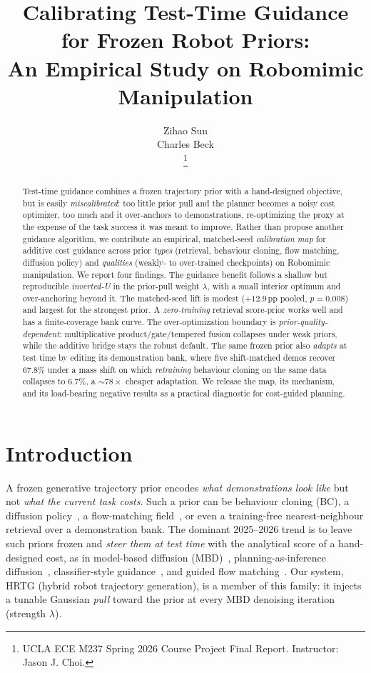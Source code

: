 \documentclass[letterpaper, 10 pt, conference]{ieeeconf}
\title{\LARGE \bf
Calibrating Test-Time Guidance for Frozen Robot Priors:\\
An Empirical Study on Robomimic Manipulation}
\author{ \parbox{3 in}{\centering Zihao Sun}
        \hspace*{ 0.1 in}
        \parbox{2.5 in}{ \centering Charles Beck}
\thanks{UCLA ECE M237 Spring 2026 Course Project Final Report.
Instructor: Jason J. Choi.}
}
\begin{document}
\maketitle

\begin{abstract}
Test-time guidance combines a frozen trajectory prior with a
hand-designed objective, but is easily \emph{miscalibrated}: too little
prior pull and the planner becomes a noisy cost optimizer, too much and it
over-anchors to demonstrations, re-optimizing the proxy at the expense of
the task success it was meant to improve. Rather than propose another
guidance algorithm, we contribute an
empirical, matched-seed \emph{calibration map} for additive cost guidance
across prior \emph{types} (retrieval, behaviour cloning, flow matching,
diffusion policy) and \emph{qualities} (weakly- to over-trained
checkpoints) on Robomimic manipulation. We report four findings. The
guidance benefit follows a shallow but reproducible \emph{inverted-U} in
the prior-pull weight $\lambda$, with a small interior optimum and
over-anchoring beyond it. The matched-seed lift is modest ($+12.9$\,pp
pooled, $p\!=\!0.008$) and largest for the strongest prior. A
\emph{zero-training} retrieval score-prior works well and has a
finite-coverage bank curve. The over-optimization boundary is
\emph{prior-quality-dependent}: multiplicative product/gate/tempered fusion
collapses under weak priors, while the additive bridge stays the robust
default. The same frozen prior also \emph{adapts} at test time by editing
its demonstration bank, where five shift-matched demos recover $67.8\%$
under a mass shift on which \emph{retraining} behaviour cloning on the same
data collapses to $6.7\%$, a $\sim\!78\times$ cheaper adaptation.
We release the map, its mechanism, and its load-bearing negative
results as a practical diagnostic for cost-guided planning.
\end{abstract}

\section{Introduction}

A frozen generative trajectory prior encodes \emph{what demonstrations
look like} but not \emph{what the current task costs}. Such a prior can be
behaviour cloning (BC), a diffusion policy~\cite{dp}, a flow-matching
field~\cite{rectflow}, or even a training-free nearest-neighbour retrieval
over a demonstration bank. The dominant 2025--2026 trend is to leave such
priors frozen and \emph{steer them at test time} with the analytical
score of a hand-designed cost, as in model-based diffusion
(MBD)~\cite{mbd}, planning-as-inference diffusion~\cite{janner2022,
carvalho2023mpd}, classifier-style guidance~\cite{dhariwal2021diffusion},
and guided flow matching~\cite{ocflow}. Our system, HRTG (hybrid robot trajectory generation), is a member of
this family: it injects a tunable Gaussian \emph{pull} toward the prior
at every MBD denoising iteration (strength $\lambda$).
\end{document}

